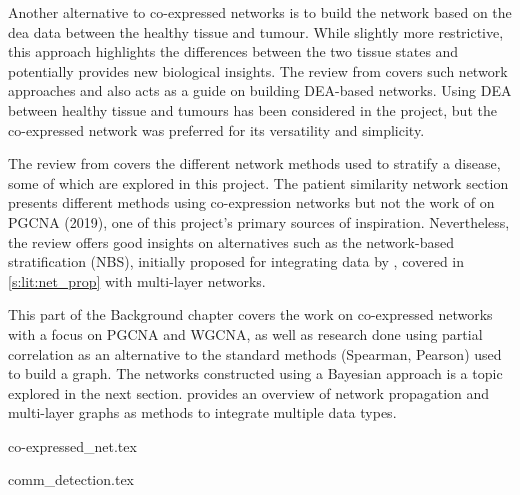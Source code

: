 Another alternative to co-expressed networks is to build the network based on the \acrfull{dea} data between the healthy tissue and tumour. While slightly more restrictive, this approach highlights the differences between the two tissue states and potentially provides new biological insights. The review from \citet{Van_Dam2018-id} covers such network approaches and also acts as a guide on building DEA-based networks. Using DEA between healthy tissue and tumours has been considered in the project, but the co-expressed network was preferred for its versatility and simplicity.

The review from \citet{Petti2023-qo} covers the different network methods used to stratify a disease, some of which are explored in this project. The patient similarity network section presents different methods using co-expression networks but not the work of \citet{Care2019-ij} on PGCNA (2019), one of this project's primary sources of inspiration. Nevertheless, the review offers good insights on alternatives such as the network-based stratification (NBS), initially proposed for integrating data by \citet{Hofree2013-ld}, covered in \cref{s:lit:net_prop} with multi-layer networks.

This part of the Background chapter covers the work on co-expressed networks with a focus on PGCNA and WGCNA, as well as research done using partial correlation as an alternative to the standard methods (Spearman, Pearson) used to build a graph. The networks constructed using a Bayesian approach is a topic explored in the next section.  provides an overview of network propagation and multi-layer graphs as methods to integrate multiple data types.

{co-expressed_net.tex}

{comm_detection.tex}






